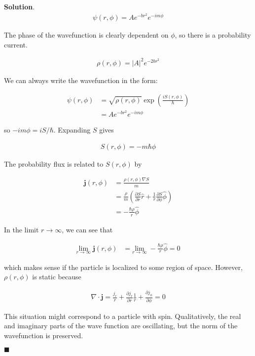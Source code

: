 \documentclass[12pt]{article}
\theoremstyle{definition}
\newenvironment{s}{%
        \begin{trivlist} \item \textbf{Solution}. }{%
            \hspace*{\fill} $\blacksquare$\end{trivlist}}%
\begin{document}
{\begin{s}
\begin{align*}
\psi(r,\phi) = Ae^{-br^{2}}e^{-im\phi}
\end{align*}

The phase of the wavefunction is clearly dependent on $\phi$, so there is a probability current.  

\begin{align*}
\rho(r,\phi) = |A|^{2}e^{-2br^{2}}
\end{align*}

We can always write the wavefunction in the form:

\begin{align*}
\psi(r,\phi) &= \sqrt{\rho(r,\phi)}\exp\left(\frac{iS(r,\phi)}{\hbar}\right)\\
&= Ae^{-br^{2}}e^{-im\phi}
\end{align*}

so $-im\phi = iS/\hbar$. Expanding $S$ gives

\begin{align*}
S(r,\phi) = -m\hbar\phi
\end{align*}

The probability flux is related to $S(r,\phi)$ by

\begin{align*}
\bm{j}(r,\phi) &= \frac{\rho(r,\phi)\nabla S}{m}\\
&= \frac{\rho}{m}\left(\frac{\partial S}{\partial r}\hat{r} + \frac{1}{r}\frac{\partial S}{\partial \phi}\hat{\phi}\right)\\
&= -\frac{\hbar\rho}{r}\hat{\phi}
\end{align*}

In the limit $r\rightarrow\infty$, we can see that 

\begin{align*}
\underset{r\rightarrow\infty}{\mathrm{lim}}\;\bm{j}(r,\phi) &= \underset{r\rightarrow\infty}{\mathrm{lim}}\; -\frac{\hbar\rho}{r}\hat{\phi} = 0
\end{align*}

which makes sense if the particle is localized to some region of space. However, $\rho(r,\phi)$ is static because

\begin{align*}
\nabla \cdot \bm{j} = \frac{j_{r}}{r} + \frac{\partial j_{r}}{\partial r} \frac{1}{r} + \frac{\partial j_{\phi}}{\partial\phi} = 0
\end{align*}

This situation might correspond to a particle with spin. Qualitatively, the real and imaginary parts of the wave function are oscillating, but the norm of the wavefunction is preserved.

\end{s}
\end{document}
